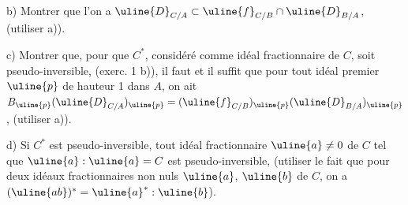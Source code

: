 b) Montrer que l'on a $\uline{D}_{C/A}\subset\uline{f}_{C/B}\cap\uline{D}_{B/A}$, (utiliser a)).

c) Montrer que, pour que $C^*$, considéré comme idéal fractionnaire de $C$, soit pseudo-inversible, (exerc. 1 b)), il faut et il suffit que pour tout idéal premier $\uline{p}$ de hauteur 1 dans $A$, on ait $B_{\uline{p}}(\uline{D}_{C/A})_{\uline{p}}=(\uline{f}_{C/B})_{\uline{p}}(\uline{D}_{B/A})_{\uline{p}}$, (utiliser a)).

d) Si $C^*$ est pseudo-inversible, tout idéal fractionnaire $\uline{a}\neq0$ de $C$ tel que $\uline{a}:\uline{a}=C$ est pseudo-inversible, (utiliser le fait que pour deux idéaux fractionnaires non nuls $\uline{a}$, $\uline{b}$ de $C$, on a $(\uline{ab})^*=\uline{a}^*:\uline{b}$).
